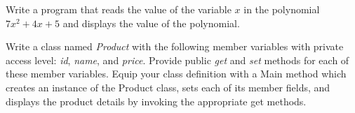 {\begin{list}{P \thechapter.\theenumi}
\item Write a program that reads the value of the variable $x$ in
the polynomial $7x^2 + 4x + 5$  and displays the value of the
polynomial.

\item Write a class named \emph{Product} with the following member
variables with private access level: \emph{id}, \emph{name}, and
\emph{price}. Provide public \emph{get} and \emph{set} methods for
each of these member variables. Equip your class definition with a
Main method which creates an instance of the Product class, sets
each of its member fields, and displays the product details by
invoking the appropriate get methods.


\end{list}

}   %
